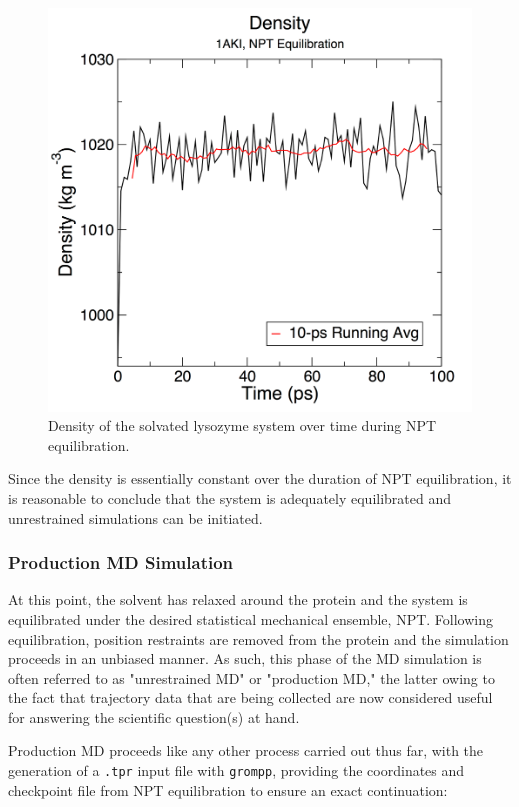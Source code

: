 \documentclass[9pt,tutorial]{livecoms}
\begin{document}
\begin{figure}[h]
\centering
\includegraphics{plot_lyso_npt_density}
\caption{Density of the solvated lysozyme system over time during NPT equilibration.}
\label{lyso_npt_dens_fig}
\end{figure}

Since the density is essentially constant over the duration of NPT equilibration, it is reasonable to conclude that the system is adequately equilibrated and unrestrained simulations can be initiated.

\subsubsection{Production MD Simulation} \label{lyso_md}

At this point, the solvent has relaxed around the protein and the system is equilibrated under the desired statistical mechanical ensemble, NPT. Following equilibration, position restraints are removed from the protein and the simulation proceeds in an unbiased manner. As such, this phase of the MD simulation is often referred to as "unrestrained MD" or "production MD," the latter owing to the fact that trajectory data that are being collected are now considered useful for answering the scientific question(s) at hand.

Production MD proceeds like any other process carried out thus far, with the generation of a \texttt{.tpr} input file with \texttt{grompp}, providing the coordinates and checkpoint file from NPT equilibration to ensure an exact continuation:
\end{document}
